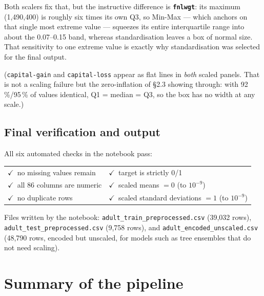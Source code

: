 \documentclass[11pt,a4paper]{article}
\newcommand{\yes}{\textcolor{hdr}{$\checkmark$}}
\newcommand{\code}[1]{\texttt{\small #1}}
\begin{document}
\medskip
\noindent
Both scalers fix that, but the instructive difference is \textbf{\code{fnlwgt}}: its maximum
(1{,}490{,}400) is roughly six times its own Q3, so Min-Max --- which anchors on that single
most extreme value --- squeezes its entire interquartile range into about the 0.07--0.15
band, whereas standardisation leaves a box of normal size. That sensitivity to one extreme
value is exactly why standardisation was selected for the final output.

\medskip
\noindent
(\code{capital-gain} and \code{capital-loss} appear as flat lines in \emph{both} scaled
panels. That is not a scaling failure but the zero-inflation of \S2.3 showing through: with
92\,\%/95\,\% of values identical, Q1 = median = Q3, so the box has no width at any scale.)

\subsection{Final verification and output}

All six automated checks in the notebook pass:

\begin{center}
\small
\begin{tabular}{ll}
\yes~no missing values remain & \yes~target is strictly 0/1 \\
\yes~all 86 columns are numeric & \yes~scaled means $= 0$ (to $10^{-9}$) \\
\yes~no duplicate rows & \yes~scaled standard deviations $= 1$ (to $10^{-9}$) \\
\end{tabular}
\end{center}

\noindent
Files written by the notebook: \code{adult\_train\_preprocessed.csv} (39{,}032 rows),
\code{adult\_test\_preprocessed.csv} (9{,}758 rows), and
\code{adult\_encoded\_unscaled.csv} (48{,}790 rows, encoded but unscaled, for models such
as tree ensembles that do not need scaling).

\section{Summary of the pipeline}
\end{document}
